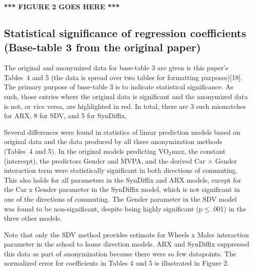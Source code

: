 \documentclass[10pt]{article}
\newcommand{\mycite}[1]{[#1]}
\begin{document}

\textbf{*** FIGURE 2 GOES HERE ***}

\subsection*{Statistical significance of regression coefficients (Base-table 3 from the original paper)}

The original and anonymized data for base-table 3 are given is this paper's Tables~4 and 5 (the data is spread over two tables for formatting purposes)\mycite{18}. The primary purpose of base-table 3 is to indicate statistical significance. As such, those entries where the original data is significant and the anonymized data is not, or vice versa, are highlighted in red. In total, there are 3 such mismatches for ARX, 8 for SDV, and 5 for SynDiffix.

Several differences were found in statistics of linear prediction models based on original data and the data produced by all three anonymization methods (Tables~4 and 5). In the original models predicting VO$_2$max, the constant (intercept), the predictors Gender and MVPA, and the derived Car × Gender interaction term were statistically significant in both directions of commuting. This also holds for all parameters in the SynDiffix and ARX models, except for the Car x Gender parameter in the SynDiffix model, which is not significant in one of the directions of commuting. The Gender parameter in the SDV model was found to be non-significant, despite being highly significant (p$\leq$.001) in the three other models.

Note that only the SDV method provides estimate for Wheels x Males interaction parameter in the school to home direction models. ARX and SynDiffix suppressed this data as part of anonymization because there were so few datapoints.
%
The normalized error for coefficients in Tables 4 and 5 is illustrated in Figure 2.
\end{document}
